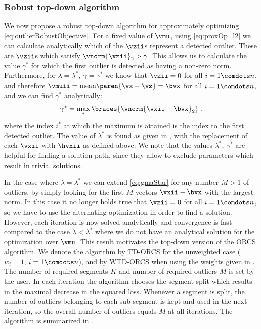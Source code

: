 \subsubsection{Robust top-down algorithm}\label{sec:robust_top_down}
We now propose a robust top-down algorithm for approximately optimizing \eqref{eq:outlierRobustObjective}.
For a fixed value of $\vmu$, using \eqref{eq:proxOp_l2} we can
calculate analytically which of the $\vzii$s represent a detected
outlier. These are $\vzii$s which satisfy
$\vnorm{\vzii}_2>\gamma$. This allows us to calculate the value
$\gamma^*$ for which the first outlier is detected as having a
non-zero norm. Furthermore, for $\lambda=\lambda^*,\ \gamma=\gamma^*$ we know that $\vzii=0$ for all $i=1\comdots n$, and therefore
$\vmuii=\mathrm{mean}\paren{\vx-\vz}=\bvx$ for all $i=1\comdots n$, and we
can find $\gamma^*$ analytically:
\begin{equation}\label{eq:gmaStar}
    \gamma^*=\max_i\braces{\vnorm{\vxii-\bvx}_2}~,
\end{equation}
where the index $i^*$ at which the maximum is attained is the index to the first detected outlier. The value of $\lambda^*$ is found as given in , with the replacement of each $\vxii$ with $\hvxii$ as defined above. We note that the values $\lambda^*,\ \gamma^*$ are helpful for finding a solution path, since they allow to exclude parameters which result in trivial solutions.

In the case where $\lambda=\lambda^*$ we can extend \eqref{eq:gmaStar} for any number $M>1$ of outliers, by simply looking for the first $M$ vectors $\vxii-\bvx$ with the largest norm.
In this case it no longer holds true that $\vzii=0$ for all $i=1\comdots n$, so
we have to use the alternating optimization in order to find a
solution. However, each iteration is now solved analytically and
convergence is fast compared to the case $\lambda<\lambda^*$ where we
do not have an analytical solution for the optimization over $\vmu$. This
result motivates the top-down version of the ORCS algorithm. We
denote the algorithm by TD-ORCS for the unweighted case ($w_i=1$, $i=1\comdots n$), and by WTD-ORCS when using the weights given in . The number of required segments $K$ and number of
required outliers $M$ is set by the user. In
each iteration the algorithm chooses the segment-split which results in
the maximal decrease in the squared loss. Whenever a segment is split,
the number of outliers belonging to each sub-segment is kept and used
in the next iteration, so the overall number of outliers equals $M$ at
all iterations. The algorithm is summarized in .

